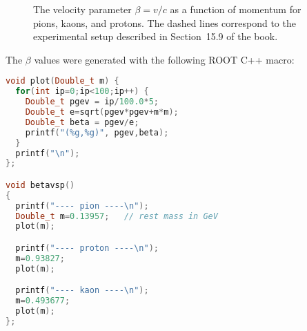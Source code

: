 \documentclass[a4paper,10pt]{article}
\begin{document}
\begin{figure}[htb]
\begin{center}
\caption{The velocity parameter $\beta=v/c$ as a function of momentum for pions,
kaons, and protons. The dashed lines correspond to the experimental setup described
in Section~15.9 of the book.}
\end{center}
\end{figure}


The $\beta$ values were generated with the following ROOT C++ macro:
\begin{lstlisting}[language=C++]
void plot(Double_t m) {
  for(int ip=0;ip<100;ip++) {
    Double_t pgev = ip/100.0*5;
    Double_t e=sqrt(pgev*pgev+m*m);
    Double_t beta = pgev/e;
    printf("(%g,%g)", pgev,beta);
  }
  printf("\n");
};

void betavsp()
{
  printf("---- pion ----\n");
  Double_t m=0.13957;   // rest mass in GeV
  plot(m);

  printf("---- proton ----\n");
  m=0.93827;
  plot(m);

  printf("---- kaon ----\n");
  m=0.493677;
  plot(m);
};
\end{lstlisting}
\end{document}

